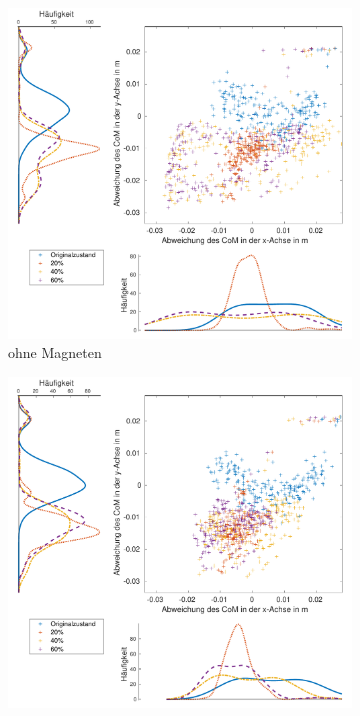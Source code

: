 \begin{landscape}
	\begin{figure}[tb]
		\centering
			\begin{subfigure}[c]{.45\linewidth}
				\centering
				\includegraphics[width=\linewidth]{Bilder/rechts_CoM_ohneM.pdf}
				\caption{ohne Magneten}
			\end{subfigure}
			\hfill
			\begin{subfigure}[c]{.45\linewidth}
				\centering
				\includegraphics[width=\linewidth]{Bilder/rechts_CoM_mitM.pdf}

\end{subfigure}
\end{figure}
\end{landscape}
